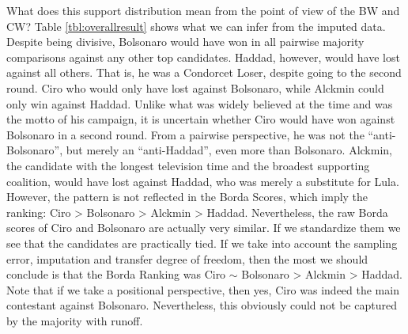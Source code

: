 \documentclass[hidelinks,11pt]{article}
\begin{document}
What does this support distribution mean from the point of view of the BW and
CW? Table \ref{tbl:overallresult} shows what we can infer from the imputed data.
Despite being divisive, Bolsonaro would have won in all pairwise majority
comparisons against any other top candidates. Haddad, however, would have lost
against all others. That is, he was a Condorcet Loser, despite going to the
second round. Ciro who would only have lost against Bolsonaro, while Alckmin
could only win against Haddad. Unlike what was widely believed at the time and
was the motto of his campaign, it is uncertain whether Ciro would have won
against Bolsonaro in a second round. From a pairwise perspective, he was not the
``anti-Bolsonaro'', but merely an ``anti-Haddad'', even more than Bolsonaro.
Alckmin, the candidate with the longest television time and the broadest
supporting coalition, would have lost against Haddad, who was merely a
substitute for Lula. However, the pattern is not reflected in the Borda Scores,
which imply the ranking: Ciro > Bolsonaro > Alckmin > Haddad. Nevertheless, the
raw Borda scores of Ciro and Bolsonaro are actually very similar. If we
standardize them we see that the candidates are practically tied. If we take
into account the sampling error, imputation and transfer degree of freedom, then
the most we should conclude is that the Borda Ranking was Ciro \(\sim\)
Bolsonaro > Alckmin > Haddad. Note that if we take a positional perspective,
then yes, Ciro was indeed the main contestant against Bolsonaro. Nevertheless,
this obviously could not be captured by the majority with runoff.
\end{document}
